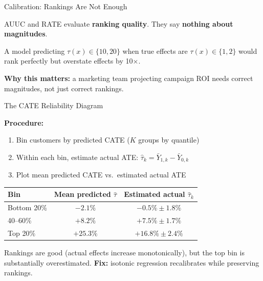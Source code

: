 \documentclass[aspectratio=169, 11pt]{beamer}
\begin{document}
\begin{frame}{Calibration: Rankings Are Not Enough}
 
AUUC and RATE evaluate \textbf{ranking quality}. They say \textbf{nothing about magnitudes}.
 
\bigskip
 
A model predicting $\hat{\tau}(x) \in \{10, 20\}$ when true effects are $\tau(x) \in \{1, 2\}$ would rank perfectly but overstate effects by 10$\times$.
 
\bigskip
 
\textbf{Why this matters:} a marketing team projecting campaign ROI needs correct magnitudes, not just correct rankings.
\end{frame}
 
\begin{frame}{The CATE Reliability Diagram}
 
\textbf{Procedure:}
\begin{enumerate}
    \item Bin customers by predicted CATE ($K$ groups by quantile)
    \item Within each bin, estimate actual ATE: $\hat{\tau}_k = \bar{Y}_{1,k} - \bar{Y}_{0,k}$
    \item Plot mean predicted CATE vs.\ estimated actual ATE
\end{enumerate}
 
\bigskip
 
\begin{center}
\begin{tabular}{lcc}
\toprule
\textbf{Bin} & \textbf{Mean predicted} $\hat{\tau}$ & \textbf{Estimated actual} $\hat{\tau}_k$ \\
\midrule
Bottom 20\% & $-2.1\%$ & $-0.5\% \pm 1.8\%$ \\
40--60\% & $+8.2\%$ & $+7.5\% \pm 1.7\%$ \\
Top 20\% & $+25.3\%$ & $+16.8\% \pm 2.4\%$ \\
\bottomrule
\end{tabular}
\end{center}
 
\bigskip
 
Rankings are good (actual effects increase monotonically), but the top bin is substantially overestimated. \textbf{Fix:} isotonic regression recalibrates while preserving rankings.
\end{frame}
 
\end{document}
